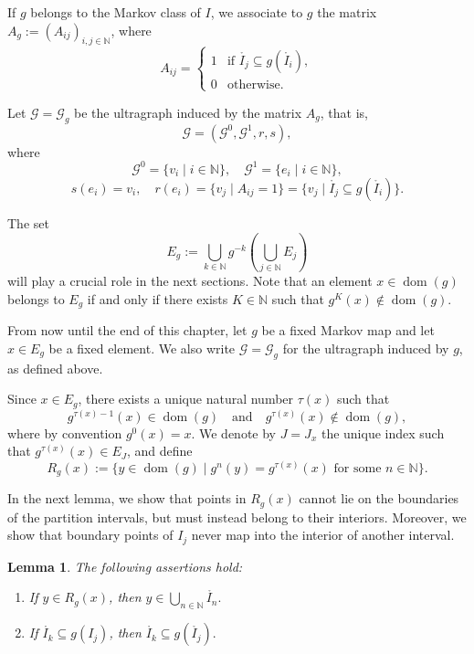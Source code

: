 \documentclass[12pt, reqno]{amsart}
\newtheorem{lemma}[theorem]{Lemma}
\theoremstyle{definition}
\theoremstyle{remark}
\numberwithin{equation}{section}
\begin{document}
If $g$ belongs to the Markov class of $I$, we associate to $g$ the matrix 
$A_g := (A_{ij})_{i,j \in \mathbb{N}}$, where
\[
A_{ij} =
\begin{cases}
    1 & \text{if } \mathring{I_j} \subseteq g(\mathring{I_i}), \\[4pt]
    0 & \text{otherwise}.
\end{cases}
\]

Let $\mathcal{G} = \mathcal{G}_g$ be the ultragraph induced by the matrix $A_g$, 
that is, 
\[
\mathcal{G} = (\mathcal{G}^0, \mathcal{G}^1, r, s),
\]
where
\[
\mathcal{G}^0 = \{ v_i \mid i \in \mathbb{N} \}, 
\quad 
\mathcal{G}^1 = \{ e_i \mid i \in \mathbb{N} \},
\]
\[
s(e_i) = v_i, 
\quad 
r(e_i) = \{ v_j \mid A_{ij} = 1 \} 
= \{ v_j \mid \mathring{I_j} \subseteq g(\mathring{I_i}) \}.
\]


The set
\[
E_g := \bigcup_{k \in \mathbb{N}} g^{-k} \left( \bigcup_{j \in \mathbb{N}} E_j \right)
\]
will play a crucial role in the next sections. 
Note that an element $x \in \operatorname{dom}(g)$ belongs to $E_g$ if and only if there exists 
$K \in \mathbb{N}$ such that $g^K(x) \notin \operatorname{dom}(g)$.

From now until the end of this chapter, let $g$ be a fixed Markov map and 
let $x \in E_g$ be a fixed element. 
We also write $\mathcal{G} = \mathcal{G}_g$ for the ultragraph induced by $g$, 
as defined above. 

Since $x \in E_g$, there exists a unique natural number $\tau(x)$ such that
\[
g^{\tau(x)-1}(x) \in \operatorname{dom}(g) 
\quad \text{and} \quad 
g^{\tau(x)}(x) \notin \operatorname{dom}(g),
\]
where by convention $g^0(x) = x$. 
We denote by $J = J_x$ the unique index such that 
$g^{\tau(x)}(x) \in E_J$, and define
\[
R_g(x) := 
\{ y \in \operatorname{dom}(g) \mid 
   g^n(y) = g^{\tau(x)}(x) \text{ for some } n \in \mathbb{N} \}.
\]



In the next lemma, we show that points in $R_g(x)$ cannot lie on the boundaries of the partition intervals, but must instead belong to their interiors. Moreover, we show that boundary points of $I_j$ never map into the interior of another interval.

\begin{lemma}\label{interior}
The following assertions hold:
\begin{enumerate}
    \item If $y \in R_g(x)$, then 
    $
    y \in \bigcup_{n \in \mathbb{N}} \mathring{I_n}.
    $

    \item If $\mathring{I_k} \subseteq g(I_j)$, then 
    $
    \mathring{I_k} \subseteq g(\mathring{I_j}).
    $
\end{enumerate}
\end{lemma}
\end{document}
